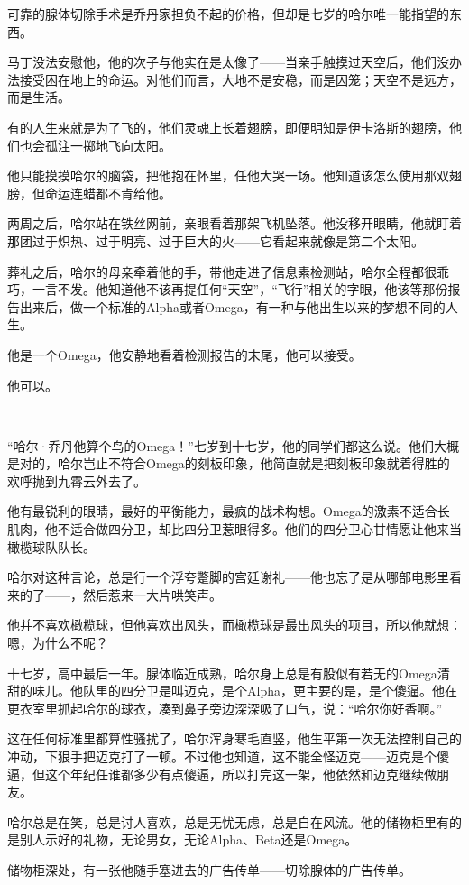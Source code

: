 \documentclass[../main]{subfiles}
\begin{document}
可靠的腺体切除手术是乔丹家担负不起的价格，但却是七岁的哈尔唯一能指望的东西。

马丁没法安慰他，他的次子与他实在是太像了——当亲手触摸过天空后，他们没办法接受困在地上的命运。对他们而言，大地不是安稳，而是囚笼；天空不是远方，而是生活。

有的人生来就是为了飞的，他们灵魂上长着翅膀，即便明知是伊卡洛斯的翅膀，他们也会孤注一掷地飞向太阳。

他只能摸摸哈尔的脑袋，把他抱在怀里，任他大哭一场。他知道该怎么使用那双翅膀，但命运连蜡都不肯给他。

两周之后，哈尔站在铁丝网前，亲眼看着那架飞机坠落。他没移开眼睛，他就盯着那团过于炽热、过于明亮、过于巨大的火——它看起来就像是第二个太阳。

葬礼之后，哈尔的母亲牵着他的手，带他走进了信息素检测站，哈尔全程都很乖巧，一言不发。他知道他不该再提任何“天空”，“飞行”相关的字眼，他该等那份报告出来后，做一个标准的Alpha或者Omega，有一种与他出生以来的梦想不同的人生。

他是一个Omega，他安静地看着检测报告的末尾，他可以接受。

他可以。

~\

“哈尔·乔丹他算个鸟的Omega！”七岁到十七岁，他的同学们都这么说。他们大概是对的，哈尔岂止不符合Omega的刻板印象，他简直就是把刻板印象就着得胜的欢呼抛到九霄云外去了。

他有最锐利的眼睛，最好的平衡能力，最疯的战术构想。Omega的激素不适合长肌肉，他不适合做四分卫，却比四分卫惹眼得多。他们的四分卫心甘情愿让他来当橄榄球队队长。

哈尔对这种言论，总是行一个浮夸蹩脚的宫廷谢礼——他也忘了是从哪部电影里看来的了——，然后惹来一大片哄笑声。

他并不喜欢橄榄球，但他喜欢出风头，而橄榄球是最出风头的项目，所以他就想：嗯，为什么不呢？

十七岁，高中最后一年。腺体临近成熟，哈尔身上总是有股似有若无的Omega清甜的味儿。他队里的四分卫是叫迈克，是个Alpha，更主要的是，是个傻逼。他在更衣室里抓起哈尔的球衣，凑到鼻子旁边深深吸了口气，说：“哈尔你好香啊。”

这在任何标准里都算性骚扰了，哈尔浑身寒毛直竖，他生平第一次无法控制自己的冲动，下狠手把迈克打了一顿。不过他也知道，这不能全怪迈克——迈克是个傻逼，但这个年纪任谁都多少有点傻逼，所以打完这一架，他依然和迈克继续做朋友。

哈尔总是在笑，总是讨人喜欢，总是无忧无虑，总是自在风流。他的储物柜里有的是别人示好的礼物，无论男女，无论Alpha、Beta还是Omega。

储物柜深处，有一张他随手塞进去的广告传单——切除腺体的广告传单。
\end{document}
